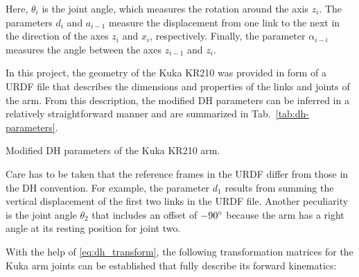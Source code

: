 \documentclass[twoside]{article}
\newcommand{\tabref}[1]{Tab.~\ref{tab:#1}}
\begin{document}
Here, $\theta_i$ is the joint angle, which measures the rotation around the axis $z_i$.
The parameters $d_i$ and $a_{i-1}$ measure the displacement from one link to the next in
the direction of the axes $z_i$ and $x_i$, respectively. Finally, the parameter $\alpha_{i-i}$
measures the angle between the axes $z_{i-1}$ and $z_i$.

In this project, the geometry of the Kuka KR210 was provided in form of a URDF file that
describes the dimensions and properties of the links and joints of the arm. From this description,
the modified DH parameters can be inferred in a relatively straightforward manner and are summarized
in \tabref{dh-parameters}.
\begin{table}[ht]
\caption{Modified DH parameters of the Kuka KR210 arm.}
\label{tab:dh-parameters}

\end{table}

Care has to be taken that the reference frames in the URDF differ from those in the DH convention.
For example, the parameter $d_1$ results from summing the vertical displacement of the first
two links in the URDF file. Another peculiarity is the joint angle $\theta_2$ that includes
an offset of $-90\degree$ because the arm has a right angle at its resting position for
joint two.

With the help of \eqref{eq:dh_transform}, the following transformation matrices for the
Kuka arm joints can be established that fully describe its forward kinematics:
\end{document}
